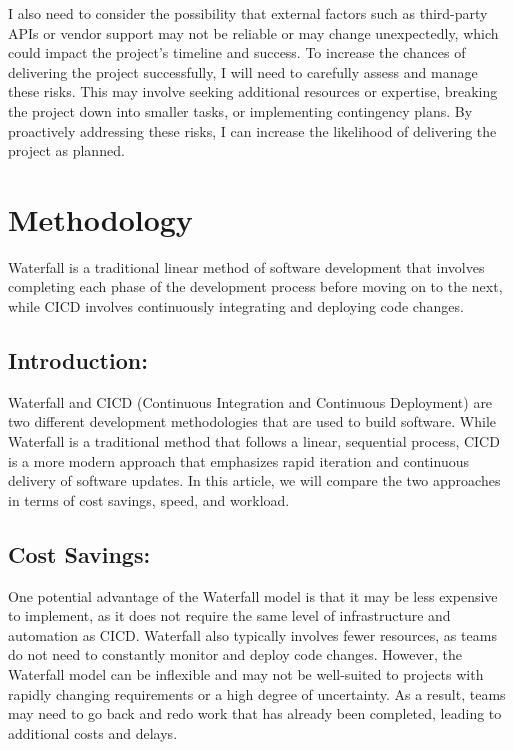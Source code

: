 \documentclass[
  10pt,
  paper=a4,
  ,captions=tableheading
]{scrartcl}
\begin{document}
I also need to consider the possibility that external factors such as
third-party APIs or vendor support may not be reliable or may change
unexpectedly, which could impact the project's timeline and success. To
increase the chances of delivering the project successfully, I will need
to carefully assess and manage these risks. This may involve seeking
additional resources or expertise, breaking the project down into
smaller tasks, or implementing contingency plans. By proactively
addressing these risks, I can increase the likelihood of delivering the
project as planned.

\hypertarget{methodology}{%
\section{Methodology}\label{methodology}}

Waterfall is a traditional linear method of software development that
involves completing each phase of the development process before moving
on to the next, while CICD involves continuously integrating and
deploying code changes.

\hypertarget{introduction-1}{%
\subsection{Introduction:}\label{introduction-1}}

Waterfall and CICD (Continuous Integration and Continuous Deployment)
are two different development methodologies that are used to build
software. While Waterfall is a traditional method that follows a linear,
sequential process, CICD is a more modern approach that emphasizes rapid
iteration and continuous delivery of software updates. In this article,
we will compare the two approaches in terms of cost savings, speed, and
workload.

\hypertarget{cost-savings}{%
\subsection{Cost Savings:}\label{cost-savings}}

One potential advantage of the Waterfall model is that it may be less
expensive to implement, as it does not require the same level of
infrastructure and automation as CICD. Waterfall also typically involves
fewer resources, as teams do not need to constantly monitor and deploy
code changes. However, the Waterfall model can be inflexible and may not
be well-suited to projects with rapidly changing requirements or a high
degree of uncertainty. As a result, teams may need to go back and redo
work that has already been completed, leading to additional costs and
delays.
\end{document}
